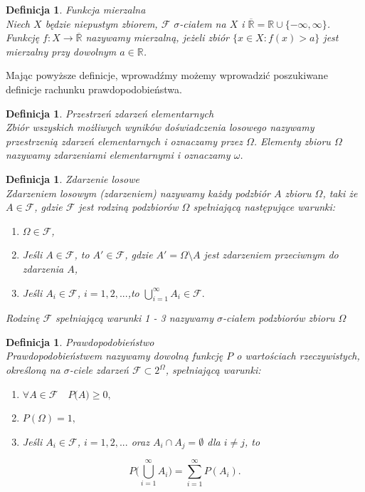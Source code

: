 \documentclass[12pt,a4paper]{report}
\newtheorem{definition}[theorem]{Definicja}
\begin{document}
\begin{definition}{Funkcja mierzalna \cite[w oparciu o rozdział 8.2]{rudnicki2006}}\\
Niech $X$ będzie niepustym zbiorem, $\mathcal{F}$  $\sigma$-ciałem na $X$ i $\overline{\mathbb{R}} = \mathbb{R} \cup \{-\infty, \infty \}$. Funkcję $f: X \rightarrow \overline{\mathbb{R}}$ nazywamy mierzalną, jeżeli zbiór $\{ x \in X: f(x) > a \}$ jest mierzalny przy dowolnym $a \in \mathbb{R}$.
\end{definition}

Mając powyższe definicje, wprowadźmy możemy wprowadzić poszukiwane definicje rachunku prawdopodobieństwa. 

\begin{definition}{Przestrzeń zdarzeń elementarnych \cite[w oparciu o rozdział 1.1]{krysicki1999}}\\
Zbiór wszyskich możliwych wyników doświadczenia losowego nazywamy przestrzenią zdarzeń elementarnych i oznaczamy przez $\Omega$. Elementy zbioru $\Omega$ nazywamy zdarzeniami elementarnymi i oznaczamy $\omega$.
\end{definition}

\begin{definition}{Zdarzenie losowe \cite[w oparciu o rozdział 1.1]{krysicki1999}}\\
Zdarzeniem losowym (zdarzeniem) nazywamy każdy podzbiór $\textit{A}$ zbioru $\Omega$, taki że  $A \in \mathcal{F}$, gdzie $\mathcal{F}$ jest rodziną podzbiorów $\Omega$ spełniającą następujące warunki:
\begin{enumerate}
\item $\Omega \in \mathcal{F}$,
\item Jeśli $A \in \mathcal{F}$, to $\textit{A$'$} \in \mathcal{F}$, gdzie $\textit{A$'$} = \Omega \setminus A $ jest zdarzeniem przeciwnym do zdarzenia $\textit{A}$,
\item Jeśli $\textit{A}_{i} \in \mathcal{F}$, $i= 1, 2, ...$,to $\bigcup\limits_{i=1}^{\infty} A_{i} \in \mathcal{F}. $
\end{enumerate}
Rodzinę $\mathcal{F}$ spełniającą warunki 1 - 3 nazywamy $\sigma$-ciałem podzbiorów zbioru $\Omega$
\end{definition}


\begin{definition}{Prawdopodobieństwo \cite[w oparciu o rozdział 1.1]{krysicki1999}}\\
Prawdopodobieństwem nazywamy dowolną funkcję $P$ o wartościach rzeczywistych, określoną na $\sigma$-ciele zdarzeń $\mathcal{F} \subset 2^\Omega$, spełniającą warunki: 
\begin{enumerate}
\item $\forall{\textit{A} \in \mathcal{F}} \quad \textit{P(A)} \geq 0,$
\item $\textit{P}(\Omega) = 1,$
\item Jeśli $\textit{A}_{i} \in \mathcal{F}$, $i= 1, 2, ...$ oraz $A_{i} \cap A_{j} = \emptyset $ dla $i \neq j$, to 
\end{enumerate}

$$P \Big(\bigcup\limits_{i=1}^{\infty} A_{i} \Big)=\sum_{i=1}^{\infty} P(A_{i}). $$

\end{definition}
\end{document}
